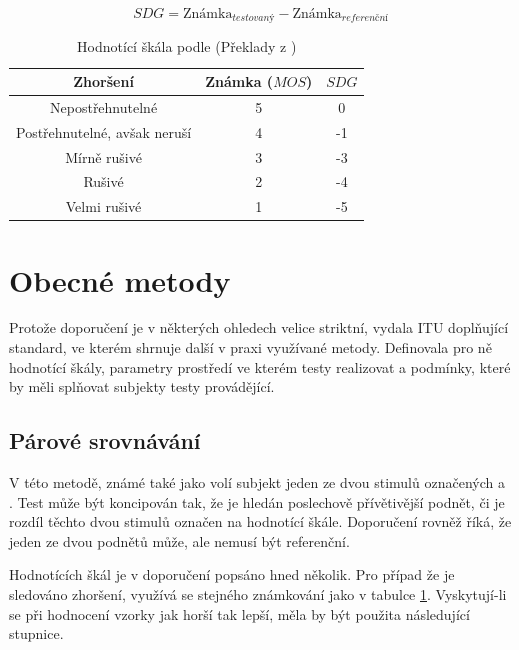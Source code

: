 \begin{equation}
    SDG = \text{Známka}_{testovaný} - \text{Známka}_{referenční}
    \label{equation:sdg}
\end{equation}


\begin{table}[h]
\centering
\begin{tabular}{|c|c|c|}
\hline
Zhoršení       & Známka ($MOS$) & $SDG$  \\ \hline
Nepostřehnutelné              & 5 & 0  \\ \hline
Postřehnutelné, avšak neruší & 4 & -1 \\ \hline
Mírně rušivé       & 3 & -3 \\ \hline
Rušivé              & 2 & -4 \\ \hline
Velmi rušivé        & 1 & -5 \\ \hline
\end{tabular}
\caption{Hodnotící škála podle \cite{itur:1116} (Překlady z \cite{book:melka})}
\label{table:impairment}
\end{table}

\section{Obecné metody}

Protože doporučení \cite{itur:1116} je v některých ohledech velice striktní, vydala ITU doplňující standard, ve kterém shrnuje další v praxi využívané metody. Definovala pro ně hodnotící škály, parametry prostředí ve kterém testy realizovat a podmínky, které by měli splňovat subjekty testy provádějící.

\subsection{Párové srovnávání}

V této metodě, známé také jako  volí subjekt jeden ze dvou stimulů označených  a . Test může být koncipován tak, že je hledán poslechově přívětivější podnět, či je rozdíl těchto dvou stimulů označen na hodnotící škále. Doporučení rovněž říká, že jeden ze dvou podnětů může, ale nemusí být referenční.

Hodnotících škál je v doporučení popsáno hned několik. Pro případ že je sledováno zhoršení, využívá se stejného známkování jako v tabulce \ref{table:impairment}. Vyskytují-li se při hodnocení vzorky jak horší tak lepší, měla by být použita následující stupnice.

